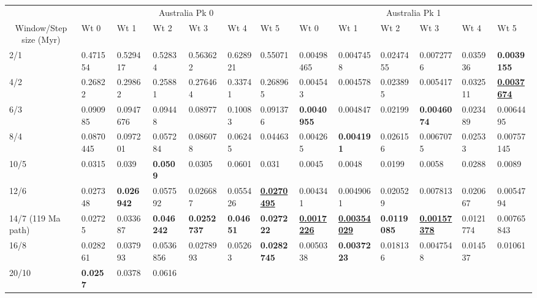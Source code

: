 \begin{landscape}
\begin{table*}
{\begin{tabular}{|l|l|l|l|l|l|l|l|l|l|l|l|l|}
\hline
\multicolumn{1}{|c|}{} & \multicolumn{6}{c|}{Australia Pk 0} &
  \multicolumn{6}{c|}{Australia Pk 1} \\ \cline{2-13} 
\multicolumn{1}{|c|}{\multirow{-2}{*}{Window/Step size (Myr)}} & Wt 0 & Wt 1 & Wt 2 & Wt 3 & Wt 4 & Wt 5 & Wt 0 & Wt 1 & Wt 2 & Wt 3 & Wt 4 & Wt 5 \\ \hline
2/1 & 0.471554 & 0.529417 & 0.52834 & 0.563622 & 0.628921 & 0.55071 &
  0.00498465 & 0.0047458 & 0.0247455 & 0.0072776 & 0.035936 &
  {\color[HTML]{34FF34} \textbf{0.0039155}} \\ \hline
4/2 & 0.26822 & 0.29862 & 0.25881 & 0.276464 & 0.33741 & 0.268965 & 0.004543 &
  0.004578 & 0.023895 & 0.005417 & 0.032511 & {\color[HTML]{009901} {\ul\textbf{0.0037674}}} \\ \hline
6/3 & 0.090985 & 0.0947676 & 0.09448 & 0.08977 & 0.10083 & 0.091376 &
  {\color[HTML]{32CB00} \textbf{0.0040955}} & 0.004847 & 0.02199 &
  {\color[HTML]{34FF34} \textbf{0.0046074}} & 0.023489 & 0.0064495 \\ \hline
8/4 & 0.0870445 & 0.097201 & 0.057284 & 0.086078 & 0.06245 & 0.04463 &
  0.004265 & {\color[HTML]{34FF34} \textbf{0.004191}} & 0.026156 & 0.0067075 & 0.02533 & 0.00757145 \\ \hline
10/5 & 0.0315 & 0.039 & {\color[HTML]{34FF34} \textbf{0.0509}} & 0.0305 & 0.0601 & 0.031 &
  0.0045 & 0.0048 & 0.0199 & 0.0058 & 0.0288 & 0.0089 \\ \hline
12/6 & 0.027348 & {\color[HTML]{34FF34} \textbf{0.026942}} & 0.057592 & 0.026687 & 0.055426 &
  {\color[HTML]{009901} {\ul\textbf{0.0270495}}} & 0.004341 & 0.0049061 &
  0.020529 & 0.007813 & 0.020667 & 0.0054794 \\ \hline
14/7 (119\textendash0 Ma path) & 0.02725 & 0.033687 &
  {\color[HTML]{32CB00} \textbf{0.046242}} & {\color[HTML]{34FF34}
  \textbf{0.0252737}} & {\color[HTML]{34FF34} \textbf{0.04651}} &
  {\color[HTML]{32CB00} \textbf{0.027222}} & {\color[HTML]{009901} {\ul\textbf{0.0017226}}} & {\color[HTML]{009901} {\ul\textbf{0.00354029}}} & {\color[HTML]{34FF34} \textbf{0.0119085}} &
  {\color[HTML]{009901} {\ul\textbf{0.00157378}}} & 0.0121774 & 0.00765843 \\ \hline
16/8 & 0.028261 & 0.037993 & 0.0536856 & 0.0278993 & 0.05263 &
  {\color[HTML]{34FF34} \textbf{0.0282745}} & 0.0050338 & {\color[HTML]{32CB00}
  \textbf{0.0037223}} & 0.018136 & 0.0047548 & 0.014537 & 0.01061 \\ \hline
20/10 & {\color[HTML]{34FF34} \textbf{0.0257}} & 0.0378 & 0.0616 &

\end{tabular}}
\end{table*}
\end{landscape}
